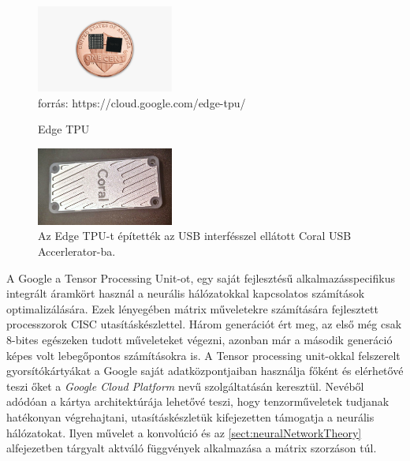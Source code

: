 \begin{figure}[h]
	\centering
	\includegraphics[width=0.4\textwidth]{fig/penny-edge-tpu}\\
	\footnotesize forrás: https://cloud.google.com/edge-tpu/
	\caption{Edge TPU}
	\label{fig:EdgeTPU}
\end{figure}
\begin{figure}[h]
	\centering
	\includegraphics[width=0.4\textwidth]{fig/Coral_USBAccelerator}\quad
	\caption[Coral USB Accelerator]{Az Edge TPU-t építették az USB interfésszel ellátott Coral USB Accerlerator-ba.\cite{web:GoogleEdge}}
	\label{fig:coralusbaccelerator}
\end{figure}


A Google a Tensor Processing Unit\texttrademark-ot, egy saját fejlesztésű alkalmazásspecifikus integrált áramkört használ a neurális hálózatokkal kapcsolatos számítások optimalizálására. Ezek lényegében mátrix műveletekre számítására fejlesztett processzorok CISC utasításkészlettel. Három generációt ért meg, az első még csak 8-bites egészeken tudott műveleteket végezni, azonban már a második generáció képes volt lebegőpontos számításokra is. A Tensor processing unit-okkal felszerelt gyorsítókártyákat a Google saját adatközpontjaiban használja főként és elérhetővé teszi őket a \emph{Google Cloud Platform} nevű szolgáltatásán keresztül. Nevéből adódóan a kártya architektúrája lehetővé teszi, hogy  tenzorműveletek tudjanak hatékonyan végrehajtani, utasításkészletük kifejezetten támogatja a neurális hálózatokat. Ilyen művelet a konvolúció és az \ref{sect:neuralNetworkTheory} alfejezetben tárgyalt aktváló függvények alkalmazása a mátrix szorzáson túl.

